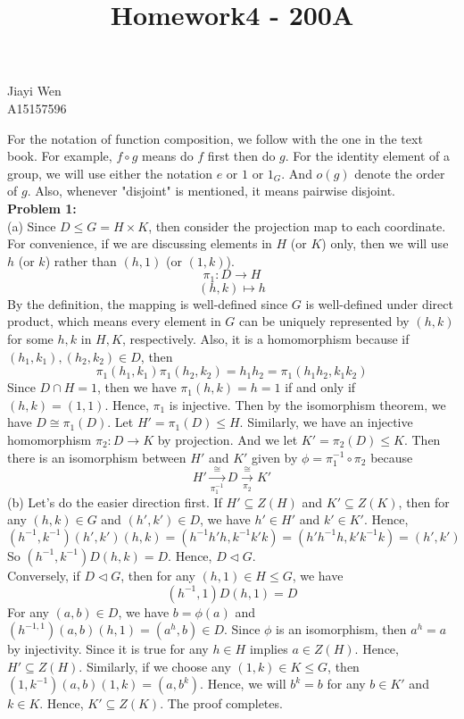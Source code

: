 \documentclass[12pt]{amsart}
\newcommand{\normal}{\triangleleft}
\begin{document}
\title{Homework4 - 200A}
\maketitle
\begin{center}
    Jiayi Wen\\
    A15157596
\end{center}
\indent For the notation of function composition, we follow with the one in the text book. For example, $f \circ g$ means do $f$ first then do $g$. For the identity element of a group, we will use either the notation $e$ or $1$ or $1_G$. And $o(g)$ denote the order of $g$. Also, whenever "disjoint" is mentioned, it means pairwise disjoint.\\
\textbf{Problem 1:}\\
(a) Since $D\leq G=H\times K$, then consider the projection map to each coordinate. For convenience, if we are discussing elements in $H$ (or $K$) only, then we will use $h$ (or $k$) rather than $(h,1)$ (or $(1,k)$).
\[\pi_1:D\to H\]
\[(h,k)\mapsto h\]
By the definition, the mapping is well-defined since $G$ is well-defined under direct product, which means every element in $G$ can be uniquely represented by $(h,k)$ for some $h,k$ in $H,K$, respectively. Also, it is a homomorphism because if $(h_1,k_1),(h_2,k_2)\in D$, then
\[\pi_1(h_1,k_1)\pi_1(h_2,k_2)=h_1h_2=\pi_1(h_1h_2,k_1k_2)\]
Since $D\cap H=1$, then we have $\pi_1(h,k)=h=1$ if and only if $(h,k)=(1,1)$. Hence, $\pi_1$ is injective. Then by the isomorphism theorem, we have $D\cong \pi_1(D)$. Let $H'= \pi_1(D)\leq H$.
Similarly, we have an injective homomorphism $\pi_2:D\to K$ by projection. And we let $K'=\pi_2(D)\leq K$.
Then there is an isomorphism between $H'$ and $K'$ given by $\phi=\pi_1^{-1}\circ \pi_2$ because
\[H'\xrightarrow[\pi_1^{-1}]{\cong }D\xrightarrow[\pi_2]{\cong }K' \]
(b) Let's do the easier direction first. If $H'\subseteq Z(H)$ and $K'\subseteq Z(K)$, then for any $(h,k)\in G$ and $(h',k')\in D$, we have $h'\in H'$ and $k'\in K'$. Hence,
\[(h^{-1},k^{-1})(h',k')(h,k)=(h^{-1}h'h,k^{-1}k'k)=(h'h^{-1}h,k'k^{-1}k)=(h',k')\]
So $(h^{-1},k^{-1})D(h,k)=D$. Hence, $D\normal G$.\\
Conversely, if $D\normal G$, then for any $(h,1)\in H\leq G$, we have
\[(h^{-1},1)D(h,1)=D\]
For any $(a,b)\in D$, we have $b=\phi(a)$ and $(h^{-1,1})(a,b)(h,1)=(a^h,b)\in D$. Since $\phi$ is an isomorphism, then $a^h=a$ by injectivity. Since it is true for any $h\in H$ implies $a\in Z(H)$. Hence, $H'\subseteq Z(H)$. Similarly, if we choose any $(1,k)\in K\leq G$, then $(1,k^{-1})(a,b)(1,k)=(a,b^k)$. Hence, we will $b^k=b$ for any $b\in K'$ and $k\in K$. Hence, $K'\subseteq Z(K)$. The proof completes.\\
\end{document}
